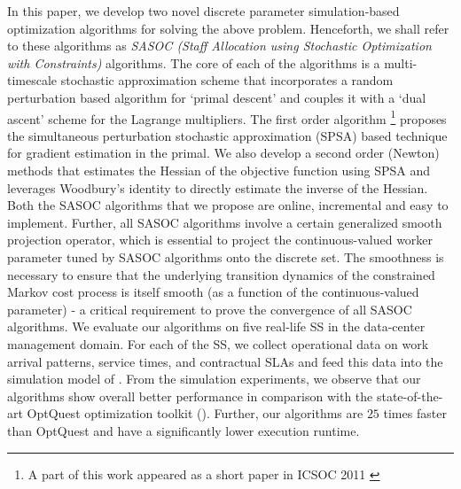 \documentclass[11pt,letterpaper,english]{article}
\begin{document}
In this paper, we develop two novel discrete parameter simulation-based
optimization
algorithms for solving the above problem. Henceforth, we shall refer to
these algorithms as \emph{SASOC (Staff Allocation using Stochastic
  Optimization with Constraints)} algorithms. 
  The core of each of the algorithms is a multi-timescale stochastic
approximation scheme that incorporates a random perturbation based algorithm
for `primal descent' and couples it with a `dual ascent' scheme for the
Lagrange multipliers. The first order algorithm \footnote{A part of this work appeared as a short paper in ICSOC 2011 \citep{prashanth2011icsoc}} 
proposes the simultaneous perturbation stochastic approximation (SPSA) based
technique for gradient estimation in the primal. We also develop a second
order (Newton) methods that
estimates the Hessian of the objective function using SPSA and leverages
Woodbury's identity to directly estimate the inverse of the Hessian.
Both the SASOC algorithms that we propose are online, incremental and easy
to implement. 
Further, all SASOC algorithms involve a certain generalized smooth projection operator, which is essential to project the continuous-valued worker parameter tuned by SASOC algorithms onto the discrete set. The smoothness is necessary to ensure that the underlying transition dynamics of the constrained Markov cost process is itself smooth (as a function of the continuous-valued parameter) - a critical requirement to prove the convergence of all SASOC algorithms.
We evaluate our algorithms on five real-life SS in the
      data-center management domain.  For each of the SS, we collect
      operational data on work arrival patterns, service times, and
      contractual SLAs and feed this data into the simulation model
      of \citep{banerjee2011simulation}.
From the simulation experiments, we observe that our
      algorithms show overall better performance in comparison with
      the state-of-the-art OptQuest optimization toolkit
      (\citep{laguna1998optimization}). Further, our algorithms are $25$
      times faster than OptQuest and have a significantly lower execution runtime.
\end{document}

